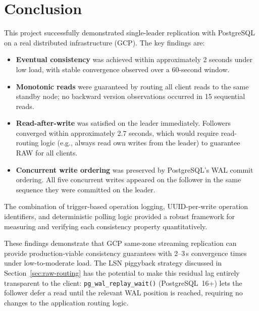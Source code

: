 \documentclass[12pt,a4paper]{article}
\begin{document}
\section{Conclusion}

This project successfully demonstrated single-leader replication with PostgreSQL
on a real distributed infrastructure (GCP). The key findings are:

\begin{itemize}    \item \textbf{Eventual consistency} was achieved within approximately 2 seconds
        under low load, with stable convergence observed over a 60-second window.
    \item \textbf{Monotonic reads} were guaranteed by routing all client reads to
        the same standby node; no backward version observations occurred in 15
        sequential reads.
    \item \textbf{Read-after-write} was satisfied on the leader immediately.
        Followers converged within approximately 2.7 seconds, which would require
        read-routing logic (e.g., always read own writes from the leader) to
        guarantee RAW for all clients.
    \item \textbf{Concurrent write ordering} was preserved by PostgreSQL's
        WAL commit ordering. All five concurrent writes appeared on the follower
        in the same sequence they were committed on the leader.
\end{itemize}

The combination of trigger-based operation logging, UUID-per-write operation identifiers,
and deterministic polling logic provided a robust framework for measuring and
verifying each consistency property quantitatively.

\begin{sloppypar}
These findings demonstrate that GCP same-zone streaming replication can provide
production-viable consistency guarantees with 2--3\,s convergence times under
low-to-moderate load. The LSN piggyback strategy discussed in
Section~\ref{sec:raw-routing} has the potential to make this residual lag
entirely transparent to the client: \texttt{pg\_wal\_replay\_wait()}
(PostgreSQL~16+) lets the follower defer a read until the relevant WAL position
is reached, requiring no changes to the application routing logic.
\end{sloppypar}
\end{document}
